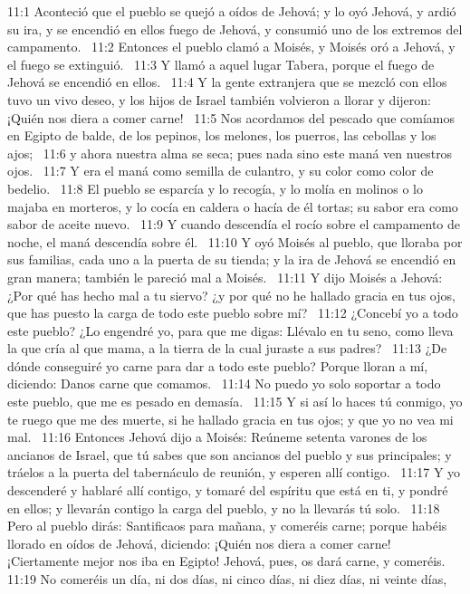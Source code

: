 11:1 Aconteció que el pueblo se quejó a oídos de Jehová; y lo oyó Jehová, y ardió su ira, y se encendió en ellos fuego de Jehová, y consumió uno de los extremos del campamento.  
11:2 Entonces el pueblo clamó a Moisés, y Moisés oró a Jehová, y el fuego se extinguió.  
11:3 Y llamó a aquel lugar Tabera, porque el fuego de Jehová se encendió en ellos.  
11:4 Y la gente extranjera que se mezcló con ellos tuvo un vivo deseo, y los hijos de Israel también volvieron a llorar y dijeron: ¡Quién nos diera a comer carne!  
11:5 Nos acordamos del pescado que comíamos en Egipto de balde, de los pepinos, los melones, los puerros, las cebollas y los ajos;  
11:6 y ahora nuestra alma se seca; pues nada sino este maná ven nuestros ojos.  
11:7 Y era el maná como semilla de culantro, y su color como color de bedelio.  
11:8 El pueblo se esparcía y lo recogía, y lo molía en molinos o lo majaba en morteros, y lo cocía en caldera o hacía de él tortas; su sabor era como sabor de aceite nuevo.  
11:9 Y cuando descendía el rocío sobre el campamento de noche, el maná descendía sobre él.  
11:10 Y oyó Moisés al pueblo, que lloraba por sus familias, cada uno a la puerta de su tienda; y la ira de Jehová se encendió en gran manera; también le pareció mal a Moisés.  
11:11 Y dijo Moisés a Jehová: ¿Por qué has hecho mal a tu siervo? ¿y por qué no he hallado gracia en tus ojos, que has puesto la carga de todo este pueblo sobre mí?  
11:12 ¿Concebí yo a todo este pueblo? ¿Lo engendré yo, para que me digas: Llévalo en tu seno, como lleva la que cría al que mama, a la tierra de la cual juraste a sus padres?  
11:13 ¿De dónde conseguiré yo carne para dar a todo este pueblo? Porque lloran a mí, diciendo: Danos carne que comamos.  
11:14 No puedo yo solo soportar a todo este pueblo, que me es pesado en demasía.  
11:15 Y si así lo haces tú conmigo, yo te ruego que me des muerte, si he hallado gracia en tus ojos; y que yo no vea mi mal.  
11:16 Entonces Jehová dijo a Moisés: Reúneme setenta varones de los ancianos de Israel, que tú sabes que son ancianos del pueblo y sus principales; y tráelos a la puerta del tabernáculo de reunión, y esperen allí contigo.  
11:17 Y yo descenderé y hablaré allí contigo, y tomaré del espíritu que está en ti, y pondré en ellos; y llevarán contigo la carga del pueblo, y no la llevarás tú solo.  
11:18 Pero al pueblo dirás: Santificaos para mañana, y comeréis carne; porque habéis llorado en oídos de Jehová, diciendo: ¡Quién nos diera a comer carne! ¡Ciertamente mejor nos iba en Egipto! Jehová, pues, os dará carne, y comeréis.  
11:19 No comeréis un día, ni dos días, ni cinco días, ni diez días, ni veinte días,  

